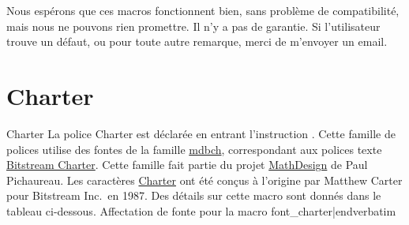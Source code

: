 Nous esp\'erons que ces macros fonctionnent bien, sans probl\`eme de compatibilit\'e, mais nous ne pouvons rien promettre. Il n'y a pas de garantie. Si l'utilisateur trouve un d\'efaut, ou pour toute autre remarque, merci de m'envoyer un email.



















\section{\sixteenbf\fontss Charter}{Charter}
\sample
\ii La police Charter est d\'eclar\'ee en entrant l'instruction {\color{brown}\verbatim}. Cette famille de polices utilise des fontes de la famille  \href{http://www.tex.ac.uk/tex-archive/help/Catalogue/entries/mathdesign-charter.html}{mdbch}, correspondant aux polices texte \href{http://www.tex.ac.uk/tex-archive/help/Catalogue/entries/charter.html}{Bitstream Charter}. Cette famille fait partie du projet \href{http://www.tex.ac.uk/tex-archive/help/Catalogue/entries/mathdesign.html}{MathDesign} de Paul Pichaureau. Les caract\`eres \href{http://new.myfonts.com/fonts/bitstream/charter-bt-pro/}{Charter} ont \'et\'e con\c cus \`a l'origine par Matthew Carter pour Bitstream Inc.\ en 1987. Des d\'etails sur cette macro sont donn\'es dans le tableau ci-dessous.
\bs
\hfil{Affectation de fonte pour la macro {\color{brown}\verbatim font_charter|endverbatim}}\hfil

